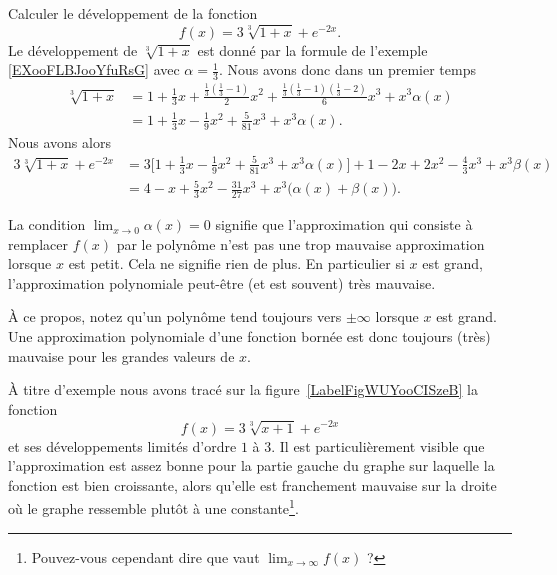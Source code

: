 \begin{example} \label{ExKPBooJmdFvY}
	Calculer le développement de la fonction
	\begin{equation}
		f(x)=3\sqrt[3]{1+x}+ e^{-2x}.
	\end{equation}
	Le développement de \( \sqrt[3]{1+x}\) est donné par la formule de l'exemple \ref{EXooFLBJooYfuRsG} avec \( \alpha=\frac{1}{ 3 }\). Nous avons donc dans un premier temps
	\begin{subequations}
		\begin{align}
			\sqrt[3]{1+x} & =1+\frac{ 1 }{ 3 }x+\frac{ \frac{1}{ 3 }\left( \frac{1}{ 3 }-1 \right) }{ 2 }x^2+\frac{ \frac{1}{ 3 }\left( \frac{1}{ 3 }-1 \right)\left( \frac{1}{ 3 }-2 \right) }{ 6 }x^3+x^3\alpha(x) \\
			              & =1+\frac{1}{ 3 }x-\frac{1}{ 9 }x^2+\frac{ 5 }{ 81 }x^3+x^3\alpha(x).
		\end{align}
	\end{subequations}
	Nous avons alors
	\begin{subequations}
		\begin{align}
			3\sqrt[3]{1+x}+ e^{-2x} & =3\Big[  1+\frac{1}{ 3 }x-\frac{1}{ 9 }x^2+\frac{ 5 }{ 81 }x^3+x^3\alpha(x)\Big]+1-2x+2x^2-\frac{ 4 }{ 3 }x^3+x^3\beta(x) \\
			                        & =4-x+\frac{ 5 }{ 3 }x^2-\frac{ 31 }{ 27 }x^3+x^3\big( \alpha(x)+\beta(x) \big).
		\end{align}
	\end{subequations}

\end{example}

La condition \( \lim_{x\to 0} \alpha(x)=0\) signifie que l'approximation qui consiste à remplacer \( f(x) \) par le polynôme n'est pas une trop mauvaise approximation lorsque \( x\) est petit. Cela ne signifie rien de plus. En particulier si \( x\) est grand, l'approximation polynomiale peut-être (et est souvent) très mauvaise.

À ce propos, notez qu'un polynôme tend toujours vers \( \pm\infty\) lorsque \( x\) est grand. Une approximation polynomiale d'une fonction bornée est donc toujours (très) mauvaise pour les grandes valeurs de \( x\).

À titre d'exemple nous avons tracé sur la figure~\ref{LabelFigWUYooCISzeB} la fonction
\begin{equation}
	f(x)=3\sqrt[3]{x+1}+ e^{-2x}
\end{equation}
et ses développements limités d'ordre \( 1\) à \( 3\). Il est particulièrement visible que l'approximation est assez bonne pour la partie gauche du graphe sur laquelle la fonction est bien croissante, alors qu'elle est franchement mauvaise sur la droite où le graphe ressemble plutôt à une constante\footnote{Pouvez-vous cependant dire que vaut \( \lim_{x\to \infty} f(x)\) ?}.

